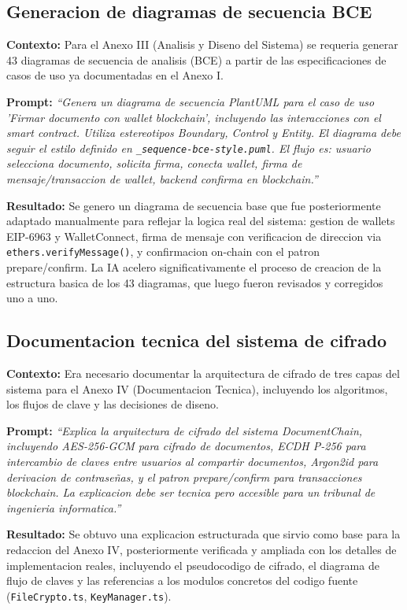 \documentclass[11pt, a4paper]{article}
\begin{document}
\subsection{Generacion de diagramas de secuencia BCE}

\textbf{Contexto:} Para el Anexo III (Analisis y Diseno del Sistema) se requeria generar 43 diagramas de secuencia de analisis (BCE) a partir de las especificaciones de casos de uso ya documentadas en el Anexo I.

\textbf{Prompt:} \textit{``Genera un diagrama de secuencia PlantUML para el caso de uso 'Firmar documento con wallet blockchain', incluyendo las interacciones con el smart contract. Utiliza estereotipos Boundary, Control y Entity. El diagrama debe seguir el estilo definido en \texttt{\_sequence-bce-style.puml}. El flujo es: usuario selecciona documento, solicita firma, conecta wallet, firma de mensaje/transaccion de wallet, backend confirma en blockchain.''}

\textbf{Resultado:} Se genero un diagrama de secuencia base que fue posteriormente adaptado manualmente para reflejar la logica real del sistema: gestion de wallets EIP-6963 y WalletConnect, firma de mensaje con verificacion de direccion via \texttt{ethers.verifyMessage()}, y confirmacion on-chain con el patron prepare/confirm. La IA acelero significativamente el proceso de creacion de la estructura basica de los 43 diagramas, que luego fueron revisados y corregidos uno a uno.

\subsection{Documentacion tecnica del sistema de cifrado}

\textbf{Contexto:} Era necesario documentar la arquitectura de cifrado de tres capas del sistema para el Anexo IV (Documentacion Tecnica), incluyendo los algoritmos, los flujos de clave y las decisiones de diseno.

\textbf{Prompt:} \textit{``Explica la arquitectura de cifrado del sistema DocumentChain, incluyendo AES-256-GCM para cifrado de documentos, ECDH P-256 para intercambio de claves entre usuarios al compartir documentos, Argon2id para derivacion de contraseñas, y el patron prepare/confirm para transacciones blockchain. La explicacion debe ser tecnica pero accesible para un tribunal de ingenieria informatica.''}

\textbf{Resultado:} Se obtuvo una explicacion estructurada que sirvio como base para la redaccion del Anexo IV, posteriormente verificada y ampliada con los detalles de implementacion reales, incluyendo el pseudocodigo de cifrado, el diagrama de flujo de claves y las referencias a los modulos concretos del codigo fuente (\texttt{FileCrypto.ts}, \texttt{KeyManager.ts}).
\end{document}

